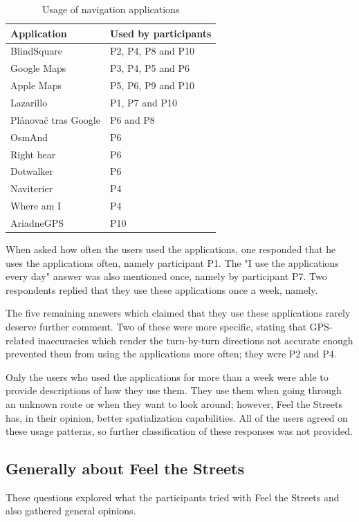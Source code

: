 \documentclass[nolof,digital]{fithesis3}
\begin{document}
\begin{table}
\caption{Usage of navigation applications}
\begin{tabularx}{\textwidth}{|X|X|}
Application & Used by participants \\
\hline
BlindSquare \parencite{blindsquare} & P2, P4, P8 and P10 \\
Google Maps \parencite{googlemaps} & P3, P4, P5 and P6 \\
Apple Maps \parencite{applemaps} & P5, P6, P9 and P10 \\
Lazarillo \parencite{lazarillo} & P1, P7 and P10 \\
Plánovač tras Google \parencite{ptg} & P6 and P8 \\
OsmAnd \parencite{osmand} & P6 \\
Right hear \parencite{righthear} & P6 \\
Dotwalker \parencite{dotwalker} & P6 \\
Naviterier \parencite{naviterier} & P4 \\
Where am I \parencite{whereami} & P4 \\
AriadneGPS \parencite{ariadnegps} & P10 \\
\end{tabularx}
\end{table}

When asked how often the users used the applications, one responded that he uses the applications often, namely participant P1. The "I use the applications every day" answer was also mentioned once, namely by participant P7. Two respondents replied that they use these applications once a week, namely.

The five remaining answers which claimed that they use these applications rarely deserve further comment. Two of these were more specific, stating that GPS-related inaccuracies which render the turn-by-turn directions not accurate enough prevented them from using the applications more often; they were P2 and P4.

Only the users who used the applications for more than a week were able to provide descriptions of how they use them. They use them when going through an unknown route or when they want to look around; however, Feel the Streets has, in their opinion, better spatialization capabilities. All of the users agreed on these usage patterns, so further classification of these responses was not provided.
\subsection{Generally about Feel the Streets}
These questions explored what the participants tried with Feel the Streets and also gathered general opinions.
\end{document}
